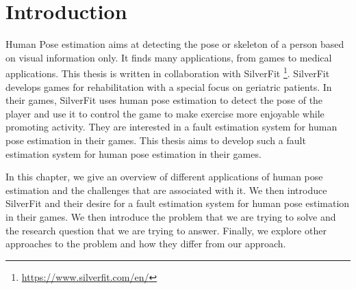\chapter{Introduction}
\setcounter{page}{1}

Human Pose estimation aims at detecting the pose or skeleton of a person based on visual information only. It finds many applications, from games to medical applications. This thesis is written in collaboration with SilverFit \footnote{\url{https://www.silverfit.com/en/}}. SilverFit develops games for rehabilitation with a special focus on geriatric patients. In their games, SilverFit uses human pose estimation to detect the pose of the player and use it to control the game to make exercise more enjoyable while promoting activity. They are interested in a fault estimation system for human pose estimation in their games. This thesis aims to develop such a fault estimation system for human pose estimation in their games.

In this chapter, we give an overview of different applications of human pose estimation and the challenges that are associated with it. We then introduce SilverFit and their desire for a fault estimation system for human pose estimation in their games. We then introduce the problem that we are trying to solve and the research question that we are trying to answer. Finally, we explore other approaches to the problem and how they differ from our approach.




